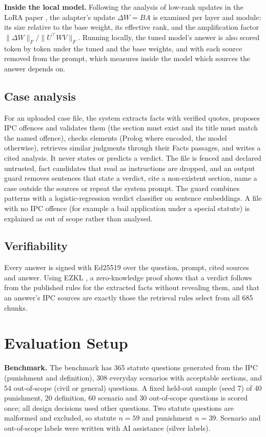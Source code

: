\documentclass[conference]{IEEEtran}
\begin{document}
\textbf{Inside the local model.} Following the analysis of low-rank updates in the LoRA paper
\cite{hu2022lora}, the adapter's update $\Delta W = BA$ is examined per layer and module: its size
relative to the base weight, its effective rank, and the amplification factor
$\lVert\Delta W\rVert_F / \lVert U^\top W V\rVert_F$. Running locally, the tuned model's answer is also
scored token by token under the tuned and the base weights, and with each source removed from the
prompt, which measures inside the model which sources the answer depends on.

\subsection{Case analysis}

For an uploaded case file, the system extracts facts with verified quotes, proposes IPC offences and
validates them (the section must exist and its title must match the named offence), checks elements
(Prolog where encoded, the model otherwise), retrieves similar judgments through their Facts
passages, and writes a cited analysis. It never states or predicts a verdict. The file is fenced and
declared untrusted, fact candidates that read as instructions are dropped, and an output guard
removes sentences that state a verdict, cite a non-existent section, name a case outside the sources
or repeat the system prompt. The guard combines patterns with a logistic-regression verdict
classifier on sentence embeddings. A file with no IPC offence (for example a bail application under a
special statute) is explained as out of scope rather than analysed.

\subsection{Verifiability}

Every answer is signed with Ed25519 \cite{bernstein2012ed25519} over the question, prompt, cited
sources and answer. Using EZKL \cite{ezkl}, a zero-knowledge proof shows that a verdict follows from
the published rules for the extracted facts without revealing them, and that an answer's IPC sources
are exactly those the retrieval rules select from all 685 chunks.

\section{Evaluation Setup}

\textbf{Benchmark.} The benchmark has 365 statute questions generated from the IPC (punishment and
definition), 308 everyday scenarios with acceptable sections, and 54 out-of-scope (civil or general)
questions. A fixed held-out sample (seed 7) of 40 punishment, 20 definition, 60 scenario and 30
out-of-scope questions is scored once; all design decisions used other questions. Two statute
questions are malformed and excluded, so statute $n=59$ and punishment $n=39$. Scenario and
out-of-scope labels were written with AI assistance (silver labels).
\end{document}
